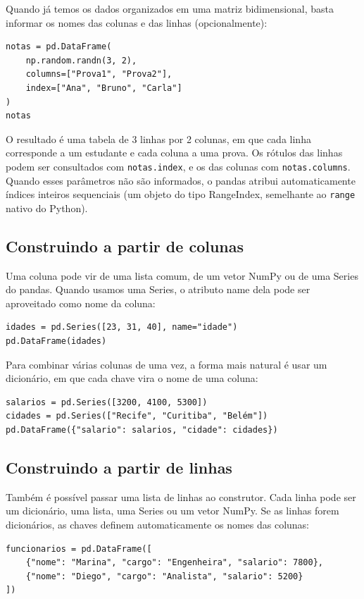 \documentclass[11pt,a4paper]{article}
\begin{document}
Quando já temos os dados organizados em uma matriz bidimensional, basta informar os nomes das colunas e das linhas (opcionalmente):
\begin{lstlisting}
notas = pd.DataFrame(
    np.random.randn(3, 2),
    columns=["Prova1", "Prova2"],
    index=["Ana", "Bruno", "Carla"]
)
notas
\end{lstlisting}

O resultado é uma tabela de 3 linhas por 2 colunas, em que cada linha corresponde a um estudante e cada coluna a uma prova. Os rótulos das linhas podem ser consultados com \texttt{notas.index}, e os das colunas com \texttt{notas.columns}. Quando esses parâmetros não são informados, o pandas atribui automaticamente índices inteiros sequenciais (um objeto do tipo RangeIndex, semelhante ao \texttt{range} nativo do Python).

\subsection{Construindo a partir de colunas}

Uma coluna pode vir de uma lista comum, de um vetor NumPy ou de uma Series do pandas. Quando usamos uma Series, o atributo name dela pode ser aproveitado como nome da coluna:
\begin{lstlisting}
idades = pd.Series([23, 31, 40], name="idade")
pd.DataFrame(idades)
\end{lstlisting}

Para combinar várias colunas de uma vez, a forma mais natural é usar um dicionário, em que cada chave vira o nome de uma coluna:
\begin{lstlisting}
salarios = pd.Series([3200, 4100, 5300])
cidades = pd.Series(["Recife", "Curitiba", "Belém"])
pd.DataFrame({"salario": salarios, "cidade": cidades})
\end{lstlisting}

\subsection{Construindo a partir de linhas}

Também é possível passar uma lista de linhas ao construtor. Cada linha pode ser um dicionário, uma lista, uma Series ou um vetor NumPy. Se as linhas forem dicionários, as chaves definem automaticamente os nomes das colunas:
\begin{lstlisting}
funcionarios = pd.DataFrame([
    {"nome": "Marina", "cargo": "Engenheira", "salario": 7800},
    {"nome": "Diego", "cargo": "Analista", "salario": 5200}
])
\end{lstlisting}
\end{document}
